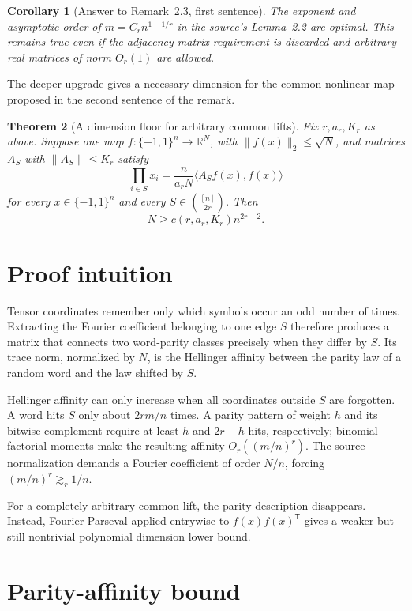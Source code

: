 \documentclass[11pt]{article}
\newtheorem{theorem}{Theorem}
\newtheorem{corollary}[theorem]{Corollary}
\newcommand{\cube}{\{-1,1\}^n}
\newcommand{\ip}[2]{\langle #1,#2\rangle}
\begin{document}
\begin{corollary}[Answer to Remark~2.3, first sentence]
The exponent and asymptotic order of $m=C_rn^{1-1/r}$ in the source's
Lemma~2.2 are optimal.  This remains true even if the adjacency-matrix
requirement is discarded and arbitrary real matrices of norm $O_r(1)$ are
allowed.
\end{corollary}

The deeper upgrade gives a necessary dimension for the common nonlinear map
proposed in the second sentence of the remark.

\begin{theorem}[A dimension floor for arbitrary common lifts]
\label{th:general}
Fix $r,a_r,K_r$ as above.  Suppose one map
$f:\cube\to\mathbb R^N$, with $\|f(x)\|_2\leq\sqrt N$, and matrices
$A_S$ with $\|A_S\|\leq K_r$ satisfy
\[
 \prod_{i\in S}x_i
 =\frac{n}{a_rN}\ip{A_Sf(x)}{f(x)}
\]
for every $x\in\cube$ and every $S\in\binom{[n]}{2r}$.  Then
\[
 N\geq c(r,a_r,K_r)n^{2r-2}.
\]
\end{theorem}

\section{Proof intuition}

Tensor coordinates remember only which symbols occur an odd number of times.
Extracting the Fourier coefficient belonging to one edge $S$ therefore
produces a matrix that connects two word-parity classes precisely when they
differ by $S$.  Its trace norm, normalized by $N$, is the Hellinger affinity
between the parity law of a random word and the law shifted by $S$.

Hellinger affinity can only increase when all coordinates outside $S$ are
forgotten.  A word hits $S$ only about $2rm/n$ times.  A parity pattern of
weight $h$ and its bitwise complement require at least $h$ and $2r-h$ hits,
respectively; binomial factorial moments make the resulting affinity
$O_r((m/n)^r)$.  The source normalization demands a Fourier coefficient of
order $N/n$, forcing $(m/n)^r\gtrsim_r1/n$.

For a completely arbitrary common lift, the parity description disappears.
Instead, Fourier Parseval applied entrywise to $f(x)f(x)^{\mathsf T}$ gives a
weaker but still nontrivial polynomial dimension lower bound.

\section{Parity-affinity bound}
\end{document}
